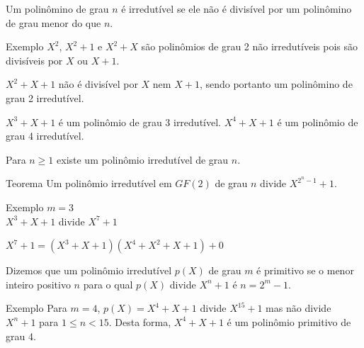 \documentclass[portuguese,aspectratio=169]{beamer}
\begin{document}
\begin{frame}[allowframebreaks]
  \framebreak
  Um polinômino de grau $n$ é irredutível se ele não é divisível por um polinômino de grau menor do que $n$.

  \begin{block}{Exemplo}
    $X^2$, $X^2+1$ e $X^2 + X$ são polinômios de grau 2 não irredutíveis pois são divisíveis por $X$ ou $X+1$.

    \vspace{2ex}
    $X^2 + X + 1$ não é divisível por $X$ nem $X+1$, sendo portanto um polinômino de grau 2 irredutível.

    \vspace{2ex}
    $X^3 + X + 1$ é um polinômio de grau 3 irredutível. $X^4 + X + 1$ é um polinômio de grau 4 irredutível.

    \vspace{2ex}
    Para $n \geq 1$ existe um polinômio irredutível de grau $n$.
  \end{block}

  \framebreak
  \begin{block}{Teorema}
    Um polinômio irredutível em $GF(2)$ de grau $n$ divide $X^{2^n-1}+1$.
  \end{block}

  \begin{block}{Exemplo}
    $m=3$\\
    $X^3+X+1$ divide $X^7+1$

    $X^7+1 = (X^3+X+1)(X^4 + X^2 + X + 1) + 0$
  \end{block}

  \framebreak
  Dizemos que um polinômio irredutível $p(X)$ de grau $m$ é primitivo se o menor inteiro positivo $n$ para o qual $p(X)$ divide $X^n+1$ é $n=2^m-1$.
  \begin{block}{Exemplo}
  Para $m=4$, $p(X)=X^4+X+1$ divide $X^{15}+1$ mas não divide $X^n+1$ para $1 \leq n < 15$. Desta forma, $X^4+X+1$ é um polinômio primitivo de grau 4.
  \end{block}


\end{frame}
\end{document}
